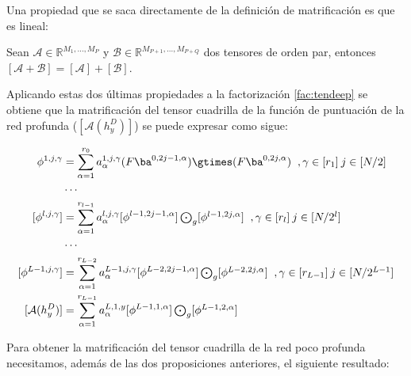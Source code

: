 Una propiedad que se saca directamente de la definición de matrificación es que es lineal:

\begin{prop}\label{prop:matrificacionlineal}
 Sean $\mathcal{A} \in \mathbb{R}^{M_1,... ,M_P}$ y $\mathcal{B} \in \mathbb{R}^{M_{P+1},... ,M_{P+Q}}$ dos tensores de orden par, entonces $[\mathcal{A}+\mathcal{B}]=[\mathcal{A}]+[\mathcal{B}]$.
\end{prop}

Aplicando estas dos últimas propiedades a la factorización \ref{fac:tendeep} se obtiene que la matrificación del tensor cuadrilla de la función de puntuación de la red profunda ($[\mathcal{A}(h_y^D)]$) se puede expresar como sigue:

\begin{equation}
\label{ec:deepmat}
\begin{aligned}
\phi^{1,j,\gamma} &= \sum^{r_0}_{\alpha=1}a_\alpha^{1,j,\gamma}(F\ba^{0,2j-1,\alpha})\gtimes(F\ba^{0,2j,\alpha}) \;\; ,\gamma \in [r_1] \:  j \in [N/2] \\
&\cdots  \\
[\phi^{l,j,\gamma}] &= \sum^{r_{l-1}}_{\alpha=1}a_\alpha^{l,j,\gamma}[\phi^{l-1,2j-1,\alpha}]\textstyle \bigodot_g[\phi^{l-1,2j,\alpha}] \;\; ,\gamma \in [r_l] \: j \in [N/2^l] \\
&\cdots  \\
[\phi^{L-1,j,\gamma}] &= \sum^{r_{L-2}}_{\alpha=1}a_\alpha^{L-1,j,\gamma}[\phi^{L-2,2j-1,\alpha}]\textstyle \bigodot_g[\phi^{L-2,2j,\alpha}] \;\; ,\gamma \in [r_{L-1}] \: j \in [N/2^{L-1}] \\
[\mathcal{A}(h_y^D)] &= \sum^{r_{L-1}}_{\alpha=1}a_\alpha^{L,1,y}[\phi^{L-1,1,\alpha}]\textstyle \bigodot_g[\phi^{L-1,2,\alpha}]\\
\end{aligned}
\end{equation}

Para obtener la matrificación del tensor cuadrilla de la red poco profunda necesitamos, además de las dos proposiciones anteriores, el siguiente resultado:

